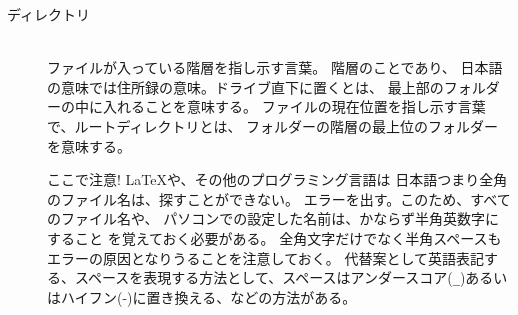 \documentclass[titlepage]{ltjsarticle}
\begin{document}
\begin{description}
  \item [ディレクトリ] ~\\
        ファイルが入っている階層を指し示す言葉。
        階層のことであり、
        日本語の意味では住所録の意味。ドライブ直下に置くとは、
        最上部のフォルダーの中に入れることを意味する。
        ファイルの現在位置を指し示す言葉で、ルートディレクトリとは、
        フォルダーの階層の最上位のフォルダーを意味する。


        ここで注意! \LaTeX や、その他のプログラミング言語は
        日本語つまり全角のファイル名は、探すことができない。
        エラーを出す。このため、すべてのファイル名や、
        パソコンでの設定した名前は、かならず半角英数字にすること
        を覚えておく必要がある。
        全角文字だけでなく半角スペースもエラーの原因となりうることを注意しておく。
        代替案として英語表記する、スペースを表現する方法として、スペースはアンダースコア(\verb|_|)あるいはハイフン(-)に置き換える、などの方法がある。


\end{description}
\end{document}
